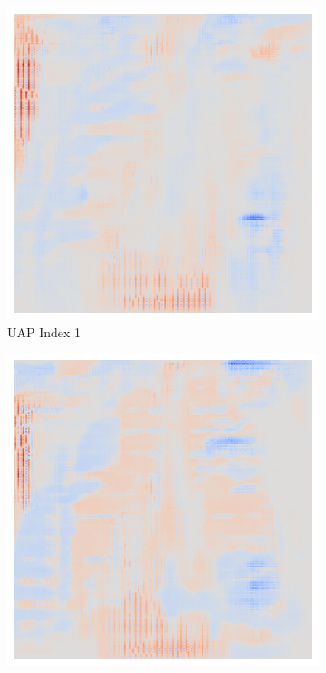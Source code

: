 \begin{figure}[ht!]
\begin{subfigure}{0.19\linewidth}
        \includegraphics[height=1\linewidth]{01-images/05-resultate/uap_efficientnet/uap1-efficientnetv2m-covid-n200-robustificationslevel0.png}
        \caption{UAP Index 1}
    \end{subfigure}\hfill%
    \begin{subfigure}{0.19\linewidth}
        \centering
        \includegraphics[height=1\linewidth]{01-images/05-resultate/uap_efficientnet/uap2-efficientnetv2m-covid-n200-robustificationslevel0.png}

\end{subfigure}
\end{figure}
